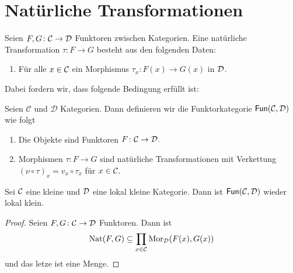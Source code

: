 \section{Natürliche Transformationen}
\begin{Def}
    Seien \(F,G\colon\mathcal{C}\to\mathcal{D}\) Funktoren zwischen Kategorien. Eine natürliche Transformation \(\tau\colon F\to G\) besteht aus den folgenden Daten:
    \begin{enumerate}
        \item Für alle \(x\in\mathcal{C}\) ein Morphismus \(\tau_x\colon F(x)\to G(x)\) in \(\mathcal{D}\).
    \end{enumerate}
\end{Def}
Dabei fordern wir, dass folgende Bedingung erfüllt ist:
\begin{Def}[Funktorkategorie]
    Seien \(\mathcal{C}\) und \(\mathcal{D}\) Kategorien. Dann definieren wir die Funktorkategorie \(\mathsf{Fun}(\mathcal{C},\mathcal{D})\) wie folgt
    \begin{enumerate}
        \item Die Objekte sind Funktoren \(F\colon \mathcal{C}\to\mathcal{D}.\)
        \item Morphismen \(\tau\colon F\to G\) sind natürliche Transformationen  mit Verkettung \((\nu\circ \tau)_x=v_x\circ\tau_x\) für \(x\in\mathcal{C}\).
    \end{enumerate}
\end{Def}
\begin{Lemma}
    Sei \(\mathcal{C}\) eine kleine und \(\mathcal{D}\) eine lokal kleine Kategorie. Dann ist \(\mathsf{Fun}(\mathcal{C},\mathcal{D})\) wieder lokal klein.
\end{Lemma}
\begin{proof}
    Seien \(F,G\colon\mathcal{C}\to\mathcal{D}\) Funktoren. Dann ist 
    \[\operatorname{Nat}(F,G)\subseteq \prod_{x\in\mathcal{C}}\operatorname{Mor}_{\mathcal{D}}(F(x),G(x))\] und das letze ist eine Menge.
\end{proof}
